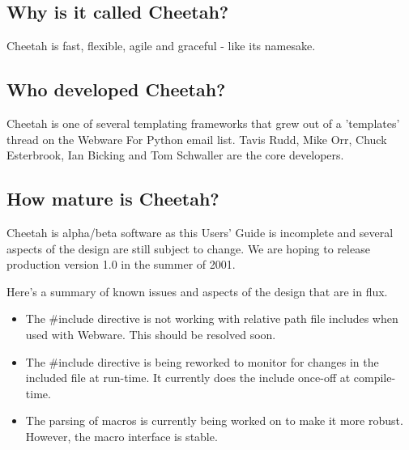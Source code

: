 \subsection{Why is it called Cheetah?}
\label{intro.name}

Cheetah is fast, flexible, agile and graceful - like its namesake. 



\subsection{Who developed Cheetah?}
\label{intro.developers}

Cheetah is one of several templating frameworks that grew out of a 'templates'
thread on the Webware For Python email list.  Tavis Rudd, Mike Orr, Chuck
Esterbrook, Ian Bicking and Tom Schwaller are the core developers.

\subsection{How mature is Cheetah?}
\label{intro.mature}

Cheetah is alpha/beta software as this Users' Guide is incomplete and several
aspects of the design are still subject to change. We are hoping to release
production version 1.0 in the summer of 2001.

Here's a summary of known issues and aspects of the design that are in flux.
\begin{itemize}
\item The \#include directive is not working with relative path file includes
     when used with Webware. This should be resolved soon.
\item The \#include directive is being reworked to monitor for changes in the
     included file at run-time. It currently does the include once-off at
     compile-time.
\item The parsing of macros is currently being worked on to make it more
     robust.  However, the macro interface is stable.

\end{itemize}

